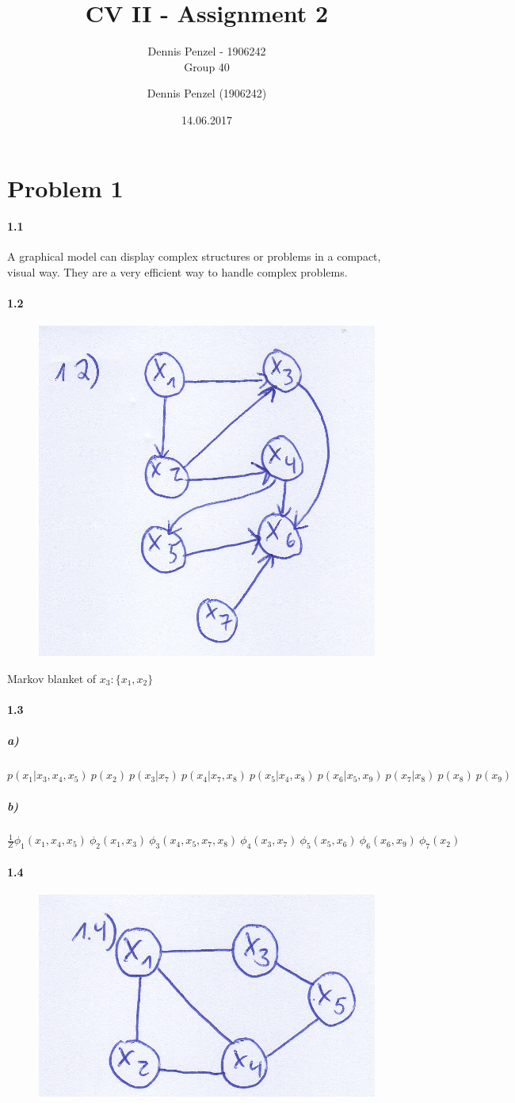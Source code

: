 \documentclass[accentcolor=tud9d,12pt,paper=a4,article]{tudexercise}
\title{CV II - Assignment 2}
\subtitle{Dennis Penzel - 1906242 \\ Group 40}
\author{Dennis Penzel (1906242)}
\date{14.06.2017}
\begin{document}
\maketitle

\section*{Problem 1}
    \paragraph{1.1}
        A graphical model can display complex structures or problems in a compact, visual way. They are a very efficient way to handle complex problems.
        
    \paragraph{1.2}
        \begin{figure}[h]
        	\centering
        	\includegraphics[width=0.4\linewidth]{Figures/a1_2}
        \end{figure}
        Markov blanket of $x_3:\{x_1,x_2\}$
    
    \paragraph{1.3}
    \subparagraph{a)}
        $p(x_1|x_3,x_4,x_5)\ p(x_2)\ p(x_3|x_7)\ p(x_4|x_7,x_8)\ p(x_5|x_4,x_8)\ p(x_6|x_5,x_9)\ p(x_7|x_8)\ p(x_8)\ p(x_9)$
    \subparagraph{b)}
        $\frac{1}{Z}\phi_1(x_1,x_4,x_5)\ \phi_2(x_1,x_3)\ \phi_3(x_4,x_5,x_7,x_8)\ \phi_4(x_3,x_7)\ \phi_5(x_5,x_6)\ \phi_6(x_6,x_9)\ \phi_7(x_2)$
    
    \paragraph{1.4}
        \begin{figure}[h]
        	\centering
        	\includegraphics[width=0.3\linewidth]{Figures/a1_4}
        \end{figure}
        \newpage
        
\end{document}
